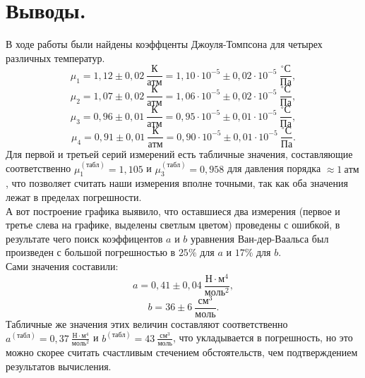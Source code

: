 \documentclass[a4paper,11pt]{article}
\begin{document}
\section{Выводы.}
В ходе работы были найдены коэффценты Джоуля-Томпсона для четырех различных температур.
$$\mu_{1} = 1,12 \pm 0,02\ \frac{К}{атм} = 1,10 \cdot 10^{-5} \pm 0,02 \cdot 10^{-5}\ \frac{^{\circ}С}{Па},$$
$$\mu_{2} = 1,07 \pm 0,02\ \frac{К}{атм} = 1,06 \cdot 10^{-5} \pm 0,02 \cdot 10^{-5}\ \frac{^{\circ}С}{Па},$$
$$\mu_{3} = 0,96 \pm 0,01\ \frac{К}{атм} = 0,95 \cdot 10^{-5} \pm 0,01 \cdot 10^{-5}\ \frac{^{\circ}С}{Па},$$
$$\mu_{4} = 0,91 \pm 0,01\ \frac{К}{атм} = 0,90 \cdot 10^{-5} \pm 0,01 \cdot 10^{-5}\ \frac{^{\circ}С}{Па}.$$
Для первой и третьей серий измерений есть табличные значения, составляющие соответственно $\mu_{1}^{(табл)} = 1,105$ и $\mu_{3}^{(табл)} = 0,958$ для давления порядка $\approx 1\ атм$, что позволяет считать наши измерения вполне точными, так как оба значения лежат в пределах погрешности.\\
А вот построение графика выявило, что оставшиеся два измерения (первое и третье слева на графике, выделены светлым цветом) проведены с ошибкой, в результате чего поиск коэффицентов $a$ и $b$ уравнения Ван-дер-Ваальса был произведен с большой погрешностью в $25\%$ для $a$ и $17\%$ для $b$.\\
Сами значения составили:
$$a = 0,41 \pm 0,04\ \frac{Н \cdot м^{4}}{моль^{2}},$$
$$b = 36 \pm 6\ \frac{см^{3}}{моль}.$$
Табличные же значения этих величин составляют соответственно $a^{(табл)} = 0,37\ \frac{Н \cdot м^{4}}{моль^{2}}$ и $b^{(табл)} = 43\ \frac{см^{3}}{моль}$, что укладывается в погрешность, но это можно скорее считать счастливым стечением обстоятельств, чем подтверждением результатов вычисления.
\end{document}
